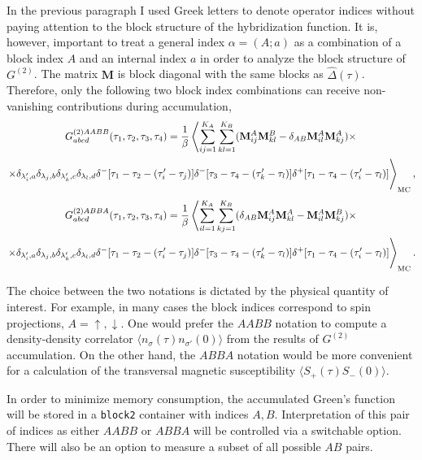 \documentclass[a4paper,12pt]{article}
\renewcommand{\t}{\ensuremath{\tau}}
\begin{document}
In the previous paragraph I used Greek letters to denote operator indices without paying attention to the block structure of the hybridization function.
It is, however, important to treat a general index $\alpha=(A;a)$ as a combination of a
block index $A$ and an internal index $a$ in order to analyze the block structure of
$G^{(2)}$. The matrix $\mathbf{M}$ is block diagonal with the same blocks as $\hat \Delta(\t)$. Therefore, only the following two block index combinations can receive
non-vanishing contributions during accumulation,
\begin{multline}\label{accum_AABB}
	G^{(2)AABB}_{abcd}(\t_1,\t_2,\t_3,\t_4) =
	\frac{1}{\beta}\left\langle
	\sum_{ij=1}^{K_A}\sum_{kl=1}^{K_B}
	(\mathbf{M}^A_{ij} \mathbf{M}^B_{kl} - \delta_{AB}\mathbf{M}^A_{il} \mathbf{M}^A_{kj})
	\times\right.\\\left.\times
	\delta_{\lambda'_i,a} \delta_{\lambda_j,b}\delta_{\lambda'_k,c} \delta_{\lambda_l,d}
	\delta^-[\t_1 - \t_2 -(\t'_i-\t_j)]\delta^-[\t_3-\t_4-(\t'_k-\t_l)]
	\delta^+[\t_1-\t_4-(\tau'_i-\tau_l)]
	\vphantom{\sum_{ijkl=1}^K} \right\rangle_\mathrm{MC},
\end{multline}
\begin{multline}\label{accum_ABBA}
	G^{(2)ABBA}_{abcd}(\t_1,\t_2,\t_3,\t_4) =
	\frac{1}{\beta}\left\langle
	\sum_{il=1}^{K_A}\sum_{kj=1}^{K_B}
	(\delta_{AB}\mathbf{M}^A_{ij} \mathbf{M}^A_{kl} - \mathbf{M}^A_{il} \mathbf{M}^B_{kj})
	\times\right.\\\left.\times
	\delta_{\lambda'_i,a} \delta_{\lambda_j,b}\delta_{\lambda'_k,c} \delta_{\lambda_l,d}
	\delta^-[\t_1 - \t_2 -(\t'_i-\t_j)]\delta^-[\t_3-\t_4-(\t'_k-\t_l)]
	\delta^+[\t_1-\t_4-(\tau'_i-\tau_l)]
	\vphantom{\sum_{ijkl=1}^K} \right\rangle_\mathrm{MC}.
\end{multline}

The choice between the two notations is dictated by the physical quantity of interest.
For example, in many cases the block indices correspond to spin projections,
$A=\uparrow,\downarrow$. One would prefer the $AABB$ notation to compute a
density-density correlator $\langle n_\sigma(\t)n_{\sigma'}(0)\rangle$ from the results
of $G^{(2)}$ accumulation. On the other hand, the $ABBA$ notation would be more
convenient for a calculation of the transversal magnetic susceptibility $\langle S_+(\t)S_-(0) \rangle$.

In order to minimize memory consumption, the accumulated Green's function will be stored
in a \texttt{block2} container with indices $A,B$. Interpretation of this pair of indices
as either $AABB$ or $ABBA$ will be controlled via a switchable option. There will also be
an option to measure a subset of all possible $AB$ pairs.
\end{document}
